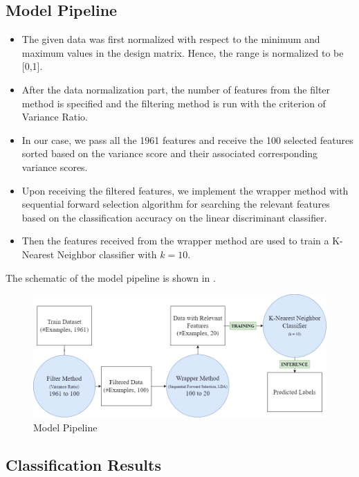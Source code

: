 \documentclass[12pt,twoside,a4paper]{article}
\begin{document}
\subsection{Model Pipeline}
\begin{itemize}
    \item The given data was first normalized with respect to the minimum and maximum values in the design matrix. Hence, the range is normalized to be [0,1].
    \item After the data normalization part, the number of features from the filter method is specified and the filtering method is run with the criterion of Variance Ratio.
    \item In our case, we pass all the 1961 features and receive the 100 selected features sorted based on the variance score and their associated corresponding variance scores.
    \item Upon receiving the filtered features, we implement the wrapper method with sequential forward selection algorithm for searching the relevant features based on the classification accuracy on the linear discriminant classifier.
    \item Then the features received from the wrapper method are used to train a K-Nearest Neighbor classifier with $k=10$.
\end{itemize}

The schematic of the model pipeline is shown in .

\begin{figure}[H]
    \centering
    \includegraphics[width=0.7\linewidth]{pipeline.png}
    \caption{Model Pipeline}
    \label{fig: NFW1}
\end{figure}

\subsection{Classification Results}

\end{document}
